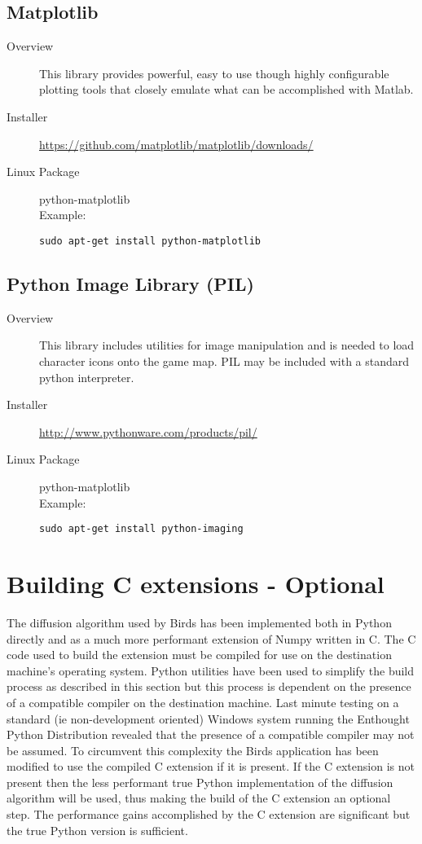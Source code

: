 \documentclass[a4paper,10pt]{article}
\begin{document}
\subsection{Matplotlib} 
\begin{description}
\item[Overview]This library provides powerful, easy to use though highly configurable plotting tools that closely emulate what can be accomplished with Matlab.
\item[Installer] \url{https://github.com/matplotlib/matplotlib/downloads/}
\item[Linux Package] python-matplotlib \\ Example: \begin{verbatim}sudo apt-get install python-matplotlib\end{verbatim}

\end{description}


\subsection{Python Image Library (PIL)} 
\begin{description}
\item[Overview] This library includes utilities for image manipulation and is needed to load character icons onto the game map.  PIL may be included with a standard python interpreter.
\item[Installer] \url{http://www.pythonware.com/products/pil/}
\item[Linux Package] python-matplotlib \\ Example: \begin{verbatim}sudo apt-get install python-imaging\end{verbatim}

\end{description}


\section{Building C extensions - Optional}
The diffusion algorithm used by Birds has been implemented both in Python directly and as a much more performant extension of Numpy written in C.  The C code used to build the extension must be compiled for use on the destination machine's operating system.  Python utilities have been used to simplify the build process as described in this section but this process is dependent on the presence of a compatible compiler on the destination machine.  Last minute testing on a standard (ie non-development oriented) Windows system running the Enthought Python Distribution revealed that the presence of a compatible compiler may not be assumed.  To circumvent this complexity the Birds application has been modified to use the compiled C extension if it is present.  If the C extension is not present then the less performant true Python implementation of the diffusion algorithm will be used, thus making the build of the C extension an optional step.  The performance gains accomplished by the C extension are significant but the true Python version is sufficient.
\end{document}
